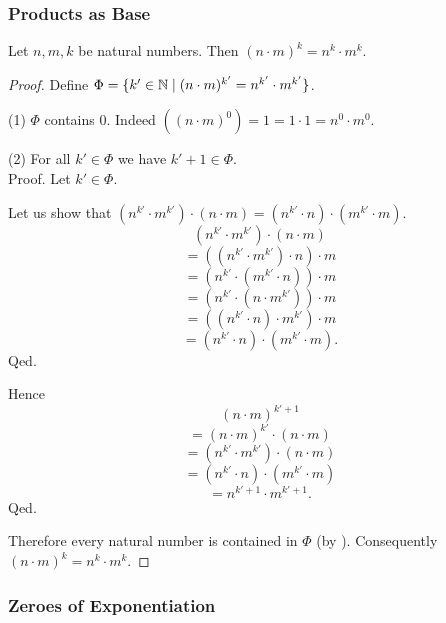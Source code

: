 \documentclass[10pt]{article}
\begin{document}
  \subsubsection*{Products as Base}

  \begin{forthel}
    \begin{proposition}[id=ARITHMETIC_09_2563032276271104,printid]
      Let $n, m, k$ be natural numbers.
      Then $(n \cdot m)^{k} = n^{k} \cdot m^{k}$.
    \end{proposition}
    \begin{proof}
      Define $\Phi = \{ k' \in \mathbb{N} \mid (n \cdot m)^{k'} = n^{k'} \cdot m^{k'} \}$.

      (1) $\Phi$ contains $0$.
      Indeed $((n \cdot m)^{0})
        = 1
        = 1 \cdot 1
        = n^{0} \cdot m^{0}$. %

      (2) For all $k' \in \Phi$ we have $k' + 1 \in \Phi$. \\
      Proof.
        Let $k' \in \Phi$.

        Let us show that $(n^{k'} \cdot m^{k'}) \cdot (n \cdot m) = (n^{k'} \cdot n) \cdot (m^{k'} \cdot m)$.
          \[  (n^{k'} \cdot m^{k'}) \cdot (n \cdot m)       \]
          \[    = ((n^{k'} \cdot m^{k'}) \cdot n) \cdot m   \]
          \[    = (n^{k'} \cdot (m^{k'} \cdot n)) \cdot m   \]
          \[    = (n^{k'} \cdot (n \cdot m^{k'})) \cdot m   \]
          \[    = ((n^{k'} \cdot n) \cdot m^{k'}) \cdot m   \]
          \[    = (n^{k'} \cdot n) \cdot (m^{k'} \cdot m).  \]
        Qed.

        Hence
        \[  (n \cdot m)^{k' + 1}                          \]
        \[    = (n \cdot m)^{k'} \cdot (n \cdot m)        \]
        \[    = (n^{k'} \cdot m^{k'}) \cdot (n \cdot m)   \]
        \[    = (n^{k'} \cdot n) \cdot (m^{k'} \cdot m)   \]
        \[    = n^{k' + 1} \cdot m^{k' + 1}.              \]
      Qed.

      Therefore every natural number is contained in $\Phi$ (by ).
      Consequently $(n \cdot m)^{k} = n^{k} \cdot m^{k}$.
    \end{proof}
  \end{forthel}


  \subsubsection*{Zeroes of Exponentiation}
\end{document}
